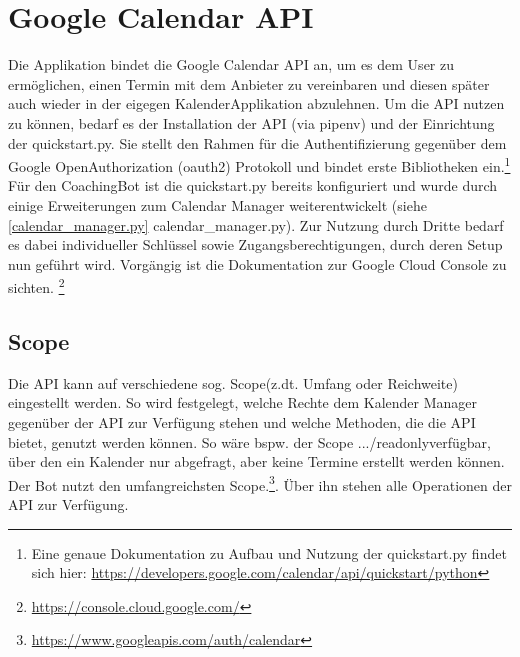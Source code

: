     \section{Google Calendar API}
        Die Applikation bindet die Google Calendar API \cite{googleCalAPI} an, um es dem User zu ermöglichen, einen Termin mit dem Anbieter zu vereinbaren und diesen später auch wieder in der eigegen Kalender\-Applikation abzulehnen.
        Um die API nutzen zu können, bedarf es der Installation der API (via pipenv) und der Einrichtung der quickstart.py. Sie stellt den Rahmen für die Authentifizierung gegenüber dem Google Open\-Authorization (oauth2) Protokoll und bindet erste Bibliotheken ein.\footnote{Eine genaue Dokumentation zu Aufbau und Nutzung der quickstart.py findet sich hier: \url{https://developers.google.com/calendar/api/quickstart/python}}
        Für den CoachingBot ist die quickstart.py bereits konfiguriert und wurde durch einige Erweiterungen zum Calendar Manager weiterentwickelt (siehe \ref{calendar_manager.py} calendar\_manager.py). Zur Nutzung durch Dritte bedarf es dabei individueller Schlüssel sowie Zugangsberechtigungen, durch deren Setup nun geführt wird. Vorgängig ist die Dokumentation zur Google Cloud Console zu sichten. 
        \footnote{\url{https://console.cloud.google.com/}}
        
            \subsection{Scope}
                Die API kann auf verschiedene sog. \glq Scope\grq (z.dt. Umfang oder Reichweite) eingestellt werden. So wird festgelegt, welche Rechte dem Kalender Manager gegenüber der API zur Verfügung stehen und welche Methoden, die die API bietet, genutzt werden können. So wäre bspw. der Scope \glqq.../readonly\grqq verfügbar, über den ein Kalender nur abgefragt, aber keine Termine erstellt werden können.\\
                Der Bot nutzt den umfangreichsten Scope.\footnote{\url{https://www.googleapis.com/auth/calendar}}. Über ihn stehen alle Operationen der API zur Verfügung.

